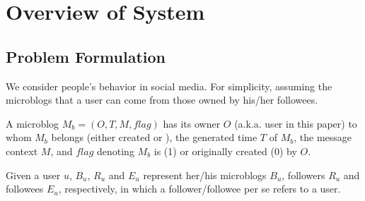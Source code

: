 \section{Overview of System \sys{}}
\label{sec:overv}


\subsection{Problem Formulation}

We consider people's \retg{} behavior in social media.
For simplicity, assuming the microblogs that a user can \ret{} come from those owned by his/her followees.


\begin{definition}
\label{def:blog}
A microblog $M_b = (O, T, M, flag)$ has its owner $O$ (a.k.a. user in this paper) to whom $M_b$ belongs (either created or \retd{}), the generated time $T$ of $M_b$, the message context $M$, and $flag$ denoting $M_b$ is \retd{} (1) or originally created (0) by $O$.
\end{definition}

\begin{definition}
\label{def:user}
Given a user $u$, $B_u$, $R_u$ and $E_u$ represent her/his microblogs $B_u$, followers $R_u$ and followees $E_u$,  respectively, in which a follower/followee per se refers to a user.
\end{definition}

